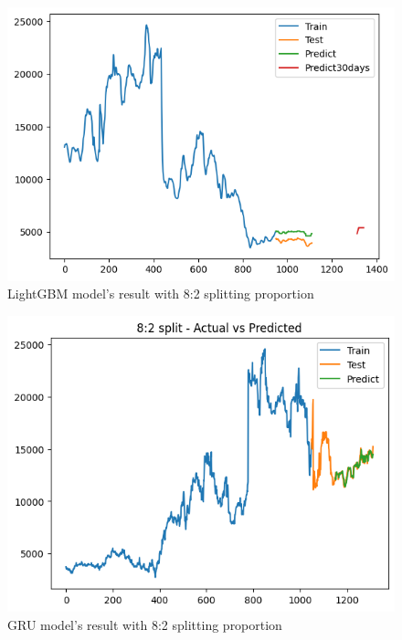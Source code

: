 \documentclass{ieeeojies}
\begin{document}
\begin{figure}[H]
  \centering
  \begin{minipage}{0.8\linewidth}
    \centering
    \includegraphics[width=\linewidth]{bibliography/Figure/LightGBM_AMV(8_2).png}
    \caption{LightGBM model's result with 8:2 splitting proportion}
    \label{fig8}
  \end{minipage}
\end{figure}

\begin{figure}[H]
  \centering
  \begin{minipage}{0.8\linewidth}
    \centering
    \includegraphics[width=\linewidth]{bibliography/Figure/AMV_GRU.png}
    \caption{GRU model's result with 8:2 splitting proportion}
    \label{fig8}
  \end{minipage}
\end{figure}
\end{document}
